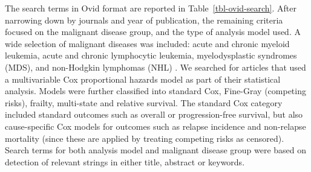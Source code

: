 \documentclass[
  letterpaper,
  DIV=11,
  numbers=noendperiod]{scrreprt}
\begin{document}
The search terms in Ovid format are reported in
Table~\ref{tbl-ovid-search}. After narrowing down by journals and year
of publication, the remaining criteria focused on the malignant disease
group, and the type of analysis model used. A wide selection of
malignant diseases was included: acute and chronic myeloid leukemia,
acute and chronic lymphocytic leukemia, myelodysplastic syndromes (MDS),
and non-Hodgkin lymphomas (NHL) . We searched for articles that used a
multivariable Cox proportional hazards model as part of their
statistical analysis. Models were further classified into standard Cox,
Fine-Gray (competing risks), frailty, multi-state and relative survival.
The standard Cox category included standard outcomes such as overall or
progression-free survival, but also cause-specific Cox models for
outcomes such as relapse incidence and non-relapse mortality (since
these are applied by treating competing risks as censored). Search terms
for both analysis model and malignant disease group were based on
detection of relevant strings in either title, abstract or keywords.

\begin{table}

\caption{\label{tbl-ovid-search}Search terms used in Ovid format, as
entered into MEDLINE and Embase.}


\end{table}%
\end{document}
